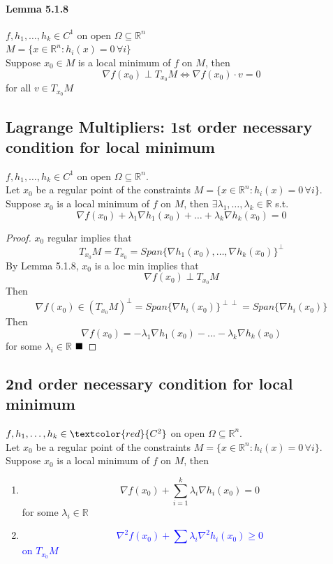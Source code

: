 \documentclass[11pt]{article}
\newcommand{\real}[0]{\mathbb{R}}
\newcommand{\qed}[0]{$\hfill\blacksquare$}
\newcommand{\tspace}[0]{T_{x_0}}
\newcommand{\tanspace}[0]{T_{x_0}M}
\begin{document}
\paragraph{Lemma 5.1.8}
$f, h_1, \hdots, h_k \in C^1$ on open $\Omega \subseteq \real^n$ \\
$ M = \{ x \in \real^n: h_i(x) = 0 \, \forall i\}$ \\
Suppose $x_0 \in M$ is a local minimum of $f$ on $M$, then
$$\nabla f(x_0) \perp T_{x_0}M \iff \nabla f(x_0)\cdot v = 0$$ for all $v \in T_{x_0}M$

\subsection{Lagrange Multipliers: 1st order necessary condition for local minimum}
$f, h_1, \hdots, h_k \in C^1$ on open $\Omega \subseteq \real^n$. \\
Let $x_0$ be a regular point of the constraints $ M = \{ x \in \real^n: h_i(x) = 0 \, \forall i\}$. \\
Suppose $x_0$ is a local minimum of $f$ on $M$, then $\exists \lambda_1, \hdots, \lambda_k \in \real$ s.t.
$$\nabla f(x_0) + \lambda_1 \nabla h_1(x_0) + \hdots + \lambda_k \nabla h_k(x_0) = 0$$
\begin{proof}
	$x_0$ regular implies that $$\tanspace = \tspace = Span\{\nabla h_1(x_0), \hdots, \nabla h_k(x_0)\}^\perp$$
	By Lemma 5.1.8, $x_0$ is a loc min implies that $$\nabla f(x_0) \perp \tanspace$$
	Then $$\nabla f(x_0) \in (\tanspace)^\perp = Span\{\nabla h_i (x_0)\}^{\perp\perp} = Span\{ \nabla h_i(x_0)\}$$
	Then 
	$$\nabla f(x_0) = -\lambda_1 \nabla h_1(x_0) - \hdots - \lambda_k \nabla h_k(x_0)$$
	for some $\lambda_i \in \real$ \qed
\end{proof} 

\subsection{2nd order necessary condition for local minimum}
$f, h_1, \hdots, h_k \in \textcolor{red}{C^2}$ on open $\Omega \subseteq \real^n$. \\
Let $x_0$ be a regular point of the constraints $ M = \{ x \in \real^n: h_i(x) = 0 \, \forall i\}$. \\
Suppose $x_0$ is a local minimum of $f$ on $M$, then
\begin{enumerate}
	\item $$\nabla f(x_0) + \sum_{i=1}^k \lambda_i \nabla h_i(x_0) = 0$$
	for some $\lambda_i \in \real$
	\item \textcolor{blue}{$$\nabla^2 f(x_0) + \sum \lambda_i \nabla^2 h_i(x_0) \geq 0$$ on $T_{x_0}M$}
\end{enumerate}
\end{document}
